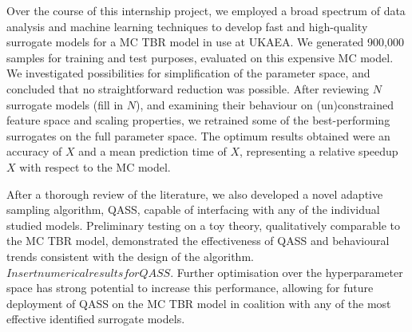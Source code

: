 Over the course of this internship project, we employed a broad spectrum of data analysis and machine learning techniques to develop fast and high-quality surrogate models for a MC TBR model in use at UKAEA. We generated 900,000 samples for training and test purposes, evaluated on this expensive MC model. We investigated possibilities for simplification of the parameter space, and concluded that no straightforward reduction was possible. After reviewing $N$ surrogate models (fill in $N$), and examining their behaviour on (un)constrained feature space and scaling properties, we retrained some of the best-performing surrogates on the full parameter space. The optimum results obtained were an accuracy of $X$ and a mean prediction time of $X$, representing a relative speedup $X$ with respect to the MC model.

After a thorough review of the literature, we also developed a novel adaptive sampling algorithm, QASS, capable of interfacing with any of the individual studied models. Preliminary testing on a toy theory, qualitatively comparable to the MC TBR model, demonstrated the effectiveness of QASS and behavioural trends consistent with the design of the algorithm. $Insert numerical results for QASS.$ Further optimisation over the hyperparameter space has strong potential to increase this performance, allowing for future deployment of QASS on the MC TBR model in coalition with any of the most effective identified surrogate models.

\newpage
